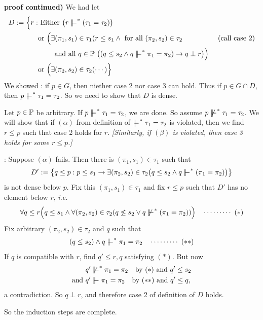 \documentclass[12pt,a4paper]{article}
\newenvironment{proof}
{\begin{changemargin}{0.5cm}{0.5cm} 
	}%
	{\end{changemargin}
}
\newenvironment{subproof}
{\begin{changemargin}{0.5cm}{0.5cm} 
	}%
	{\end{changemargin}
}
\newenvironment{p}
{\begin{proof} 
	}%
	{\end{proof}
}
\begin{document}
\begin{p}
\textbf{proof continued)} We had let
\begin{align*}
D:= \Big\{r: & \text{ Either } \big(r\forces^* (\tau_1 = \tau_2) \big) \\
& \text{or } \Big(\exists (\pi_1, s_1) \in \tau_1 (r\leq s_1 \wedge \text{ for all } (\pi_2, s_2) \in \tau_2 \quad\quad\quad\quad\quad \text{(call case 2)}\\
& \quad \quad \text{ and all } q \in \poset \,\, \big( (q\leq s_2 \wedge q\forces^* \pi_1= \pi_2) \rightarrow q\perp r \big) \Big) \\
& \text{or } \Big( \exists (\pi_2, s_2)\in \tau_2 (\cdots) \Big\}
\end{align*}
We showed : if $p\in G$, then niether case 2 nor case 3 can hold. Thus if $p\in G\cap D$, then $p\forces^* \tau_1 = \tau_2$. So we need to show that $D$ is dense.

\quad Let $p\in \mathbb{P}$ be arbitrary. If $p\forces^* \tau_1 =\tau_2$, we are done. So assume $p\not\forces^* \tau_1 =\tau_2$. We will show that if $(\alpha)$ from definition of $\forces^* \tau_1 =\tau_2$ is violated, then we find $r\leq p$ such that case 2 holds for $r$. \emph{[Similarly, if $(\beta)$ is violated, then case 3 holds for some $r\leq p$.]}
\begin{subproof}
: Suppose $(\alpha)$ fails. Then there is $(\pi_1, s_1) \in \tau_1$ such that
\begin{align*}
D' := \big\{ q\leq p : p\leq s_1 \rightarrow \exists (\pi_2, s_2) \in \tau_2 \big(q\leq s_2 \wedge q\forces^* (\pi_1 =\pi_2) \big)\big\}
\end{align*}
is not dense below $p$. Fix this $(\pi_1, s_1) \in \tau_1$ and fix $r\leq p$ such that $D'$ has no element below $r$, \textit{i.e.}
\begin{align*}
\forall q\leq r \Big( q\leq s_1 \wedge \forall(\pi_2, s_2)\in \tau_2 (q\not\leq s_2 \vee q\not\forces^* (\pi_1 =\pi_2)) \Big) \call{*}
\end{align*}
Fix arbitrary $(\pi_2, s_2) \in \tau_2$ and $q$ such that 
\begin{align*}
(q\leq s_2) \wedge q\forces^* \pi_1 =\pi_2 \call{**}
\end{align*}
If $q$ is compatible with $r$, find $q'\leq r, q$ satisfying $(*)$. But now
\begin{align*}
& q' \not\forces^* \pi_1 =\pi_2 \quad \text{by } (*) \text{ and } q' \leq s_2 \\
\text{and } & q'\forces \pi_1 =\pi_2 \quad \text{by } (**) \text{ and } q'\leq q,
\end{align*}
a contradiction. So $q\perp r$, and therefore case 2 of definition of $D$ holds.
\end{subproof} 
So the induction steps are complete.

\eop
\end{p}
\s
\end{document}
